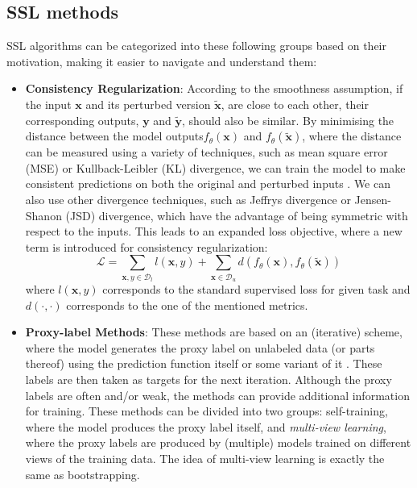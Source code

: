 \subsection{SSL methods}
SSL algorithms can be categorized into these following groups based on their motivation, making it easier to navigate and understand them\cite{ssl-overview-2020}:
\begin{itemize}
        \item \textbf{Consistency Regularization}: According to the smoothness assumption, if the input $\mathbf{x}$ and its perturbed version $\tilde{\mathbf{x}}$, 
        are close to each other, their corresponding outputs, $\mathbf{y}$ and $\tilde{\mathbf{y}}$, should also be similar. By minimising the 
        distance between the model outputs$f_\theta(\mathbf{x})$ and $f_\theta(\tilde{\mathbf{x}})$, where the distance can be measured using 
        a variety of techniques, such as mean square error (MSE) or Kullback-Leibler (KL) divergence, we can train the model to make consistent
        predictions on both the original and perturbed inputs \cite{temporal-ensembling-2017,regularization-&-pertrubations-2016}.
        We can also use other divergence techniques, such as Jeffrys divergence or Jensen-Shanon (JSD) divergence, which have the advantage of 
        being symmetric with respect to the inputs.  This leads to an expanded loss objective, where a new term is introduced for consistency 
        regularization:
        $$
        \mathcal{L} = \sum_{\mathbf{x},y \in \mathcal{D}_l}l(\mathbf{x},y) + \sum_{\mathbf{x} \in \mathcal{D}_u} d(f_\theta(\mathbf{x}),f_\theta(\tilde{\mathbf{x}}))
        $$
        where $l(\mathbf{x},y)$ corresponds to the standard supervised loss for given task and $d(\cdot,\cdot)$ corresponds to the one of the mentioned metrics. 

    \item \textbf{Proxy-label Methods}: These methods are based on an (iterative) scheme, where the model generates the proxy label on unlabeled data (or parts 
        thereof) using the prediction function itself or some variant of it \cite{psuedo-label-2013}. These labels are then taken as targets for the next iteration.
        Although the proxy labels are often and/or weak, the methods can provide additional information for training. These methods can be divided into two groups: 
        self-training, where the model produces the proxy label itself, and \textit{multi-view learning}, where the proxy labels are produced by (multiple) models
        trained on different views of the training data. The idea of multi-view learning is exactly the same as bootstrapping.


\end{itemize}
